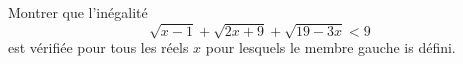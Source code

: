 \documentclass[varwidth]{standalone}
\begin{document}
    Montrer que l'in\'egalit\'e
    \[
        \sqrt{x - 1} + \sqrt{2x + 9} + \sqrt{19 - 3x} < 9  
    \]
    est v\'erifi\'ee pour tous les r\'eels $x$ pour lesquels le membre gauche is d\'efini.
\end{document}
